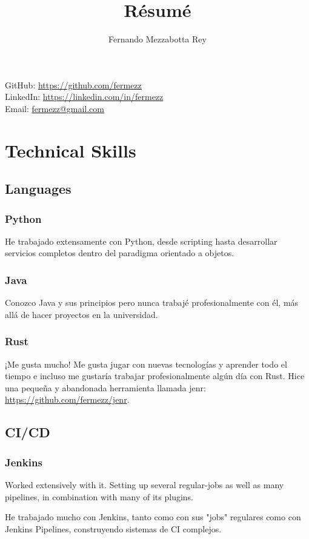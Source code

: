 \documentclass{article}
\makeatletter
\renewcommand{\maketitle}
{\begin{center}
{\huge\bfseries
\theauthor}

\vspace{.5em}

GitHub: \url{https://github.com/fermezz}\\LinkedIn: \url{https://linkedin.com/in/fermezz}\\Email: \url{fermezz@gmail.com}

\end{center}}
\makeatother
\begin{document}
\title{R\'esum\'e}
\author{Fernando Mezzabotta Rey}

\maketitle

\section{Technical Skills}
\subsection{Languages}
\subsubsection{Python}
  \begin{description}
    \item He trabajado extensamente con Python, desde scripting hasta desarrollar servicios completos dentro del paradigma orientado a objetos.
  \end{description}
\subsubsection{Java}
  \begin{description}
    \item Conozco Java y sus principios pero nunca trabajé profesionalmente con él, más allá de hacer proyectos en la universidad.
  \end{description}
\subsubsection{Rust}
  \begin{description}
    \item ¡Me gusta mucho! Me gusta jugar con nuevas tecnologías y aprender todo el tiempo e incluso me gustaría trabajar profesionalmente algún día con Rust. Hice una pequeña y abandonada herramienta llamada jenr: \url{https://github.com/fermezz/jenr}.
  \end{description}
\subsection{CI/CD}
\subsubsection{Jenkins}
  \begin{description}
    \item Worked extensively with it. Setting up several regular-jobs as well as many pipelines, in combination with many of its plugins.
    \item He trabajado mucho con Jenkins, tanto como con sus "jobs" regulares como con Jenkins Pipelines, construyendo sistemas de CI complejos.
  \end{description}
\end{document}
